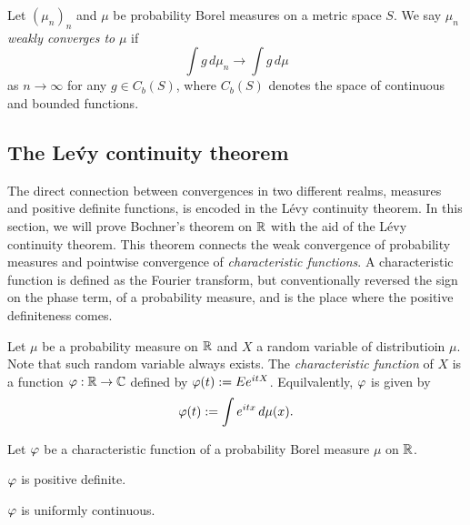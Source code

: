 \documentclass[12pt]{article}
\begin{document}
\begin{defn}
Let $(\mu_n)_n$ and $\mu$ be probability Borel measures on a metric space $S$.
We say $\mu_n$ \emph{weakly converges to} $\mu$ if
\[\int g\,d\mu_n\to\int g\,d\mu\]
as $n\to\infty$ for any $g\in C_b(S)$, where $C_b(S)$ denotes the space of continuous and bounded functions.
\end{defn}






\subsection{The Le\'vy continuity theorem}

The direct connection between convergences in two different realms, measures and positive definite functions, is encoded in the L\'evy continuity theorem.
In this section, we will prove Bochner's theorem on $\mathbb{R}$ with the aid of the L\'evy continuity theorem.
This theorem connects the weak convergence of probability measures and pointwise convergence of \emph{characteristic functions}.
A characteristic function is defined as the Fourier transform, but conventionally reversed the sign on the phase term, of a probability measure, and is the place where the positive definiteness comes.

\begin{defn}
Let $\mu$ be a probability measure on $\mathbb{R}$ and $X$ a random variable of distributioin $\mu$.
Note that such random variable always exists.
The \emph{characteristic function} of $X$ is a function $\varphi:\mathbb{R}\to\mathbb{C}$ defined by $\varphi(t):=Ee^{itX}$.
Equilvalently, $\varphi$ is given by
\[\varphi(t):=\int e^{itx}\,d\mu(x).\]
\end{defn}
\begin{prop}
Let $\varphi$ be a characteristic function of a probability Borel measure $\mu$ on $\mathbb{R}$.
\begin{parts}
\item $\varphi$ is positive definite.
\item $\varphi$ is uniformly continuous.
\end{parts}
\end{prop}
\begin{pf}
\end{pf}
\begin{ex}

\end{ex}
\begin{ex}[Polya]
\end{ex}
\end{document}
